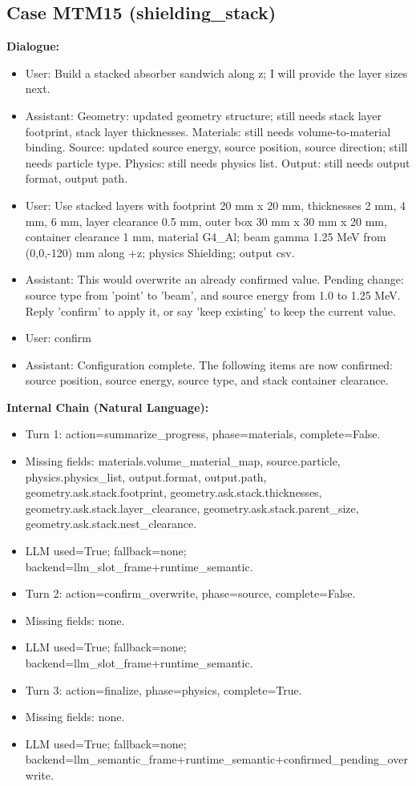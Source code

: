 \documentclass[11pt]{ctexart}
\begin{document}
\subsection{Case MTM15 (shielding\_stack)}
\textbf{Dialogue:}
\begin{itemize}
\item User: Build a stacked absorber sandwich along z; I will provide the layer sizes next.
\item Assistant: Geometry: updated geometry structure; still needs stack layer footprint, stack layer thicknesses. Materials: still needs volume-to-material binding. Source: updated source energy, source position, source direction; still needs particle type. Physics: still needs physics list. Output: still needs output format, output path.
\item User: Use stacked layers with footprint 20 mm x 20 mm, thicknesses 2 mm, 4 mm, 6 mm, layer clearance 0.5 mm, outer box 30 mm x 30 mm x 20 mm, container clearance 1 mm, material G4\_Al; beam gamma 1.25 MeV from (0,0,-120) mm along +z; physics Shielding; output csv.
\item Assistant: This would overwrite an already confirmed value. Pending change: source type from 'point' to 'beam', and source energy from 1.0 to 1.25 MeV. Reply 'confirm' to apply it, or say 'keep existing' to keep the current value.
\item User: confirm
\item Assistant: Configuration complete. The following items are now confirmed: source position, source energy, source type, and stack container clearance.
\end{itemize}
\textbf{Internal Chain (Natural Language):}
\begin{itemize}
\item Turn 1: action=summarize\_progress, phase=materials, complete=False.
\item Missing fields: materials.volume\_material\_map, source.particle, physics.physics\_list, output.format, output.path, geometry.ask.stack.footprint, geometry.ask.stack.thicknesses, geometry.ask.stack.layer\_clearance, geometry.ask.stack.parent\_size, geometry.ask.stack.nest\_clearance.
\item LLM used=True; fallback=none; backend=llm\_slot\_frame+runtime\_semantic.
\item Turn 2: action=confirm\_overwrite, phase=source, complete=False.
\item Missing fields: none.
\item LLM used=True; fallback=none; backend=llm\_slot\_frame+runtime\_semantic.
\item Turn 3: action=finalize, phase=physics, complete=True.
\item Missing fields: none.
\item LLM used=True; fallback=none; backend=llm\_semantic\_frame+runtime\_semantic+confirmed\_pending\_overwrite.
\end{itemize}
\end{document}
